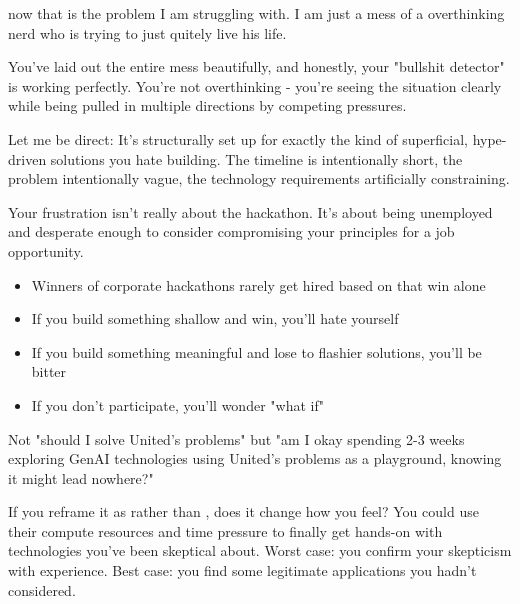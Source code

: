 now that is the problem I am struggling with. I am just a mess of a overthinking nerd who is trying to just quitely live his life.


You've laid out the entire mess beautifully, and honestly, your "bullshit detector" is working perfectly. You're not overthinking - you're seeing the situation clearly while being pulled in multiple directions by competing pressures.

Let me be direct: 
 It's structurally set up for exactly the kind of superficial, hype-driven solutions you hate building. The timeline is intentionally short, the problem intentionally vague, the technology requirements artificially constraining.

 Your frustration isn't really about the hackathon. It's about being unemployed and desperate enough to consider compromising your principles for a job opportunity.


\begin{itemize}
\item Winners of corporate hackathons rarely get hired based on that win alone
\end{itemize}
\begin{itemize}
\item If you build something shallow and win, you'll hate yourself
\end{itemize}
\begin{itemize}
\item If you build something meaningful and lose to flashier solutions, you'll be bitter
\end{itemize}
\begin{itemize}
\item If you don't participate, you'll wonder "what if"
\end{itemize}


Not "should I solve United's problems" but "am I okay spending 2-3 weeks exploring GenAI technologies using United's problems as a playground, knowing it might lead nowhere?"

If you reframe it as 
 rather than 
, does it change how you feel? You could use their compute resources and time pressure to finally get hands-on with technologies you've been skeptical about. Worst case: you confirm your skepticism with experience. Best case: you find some legitimate applications you hadn't considered.

